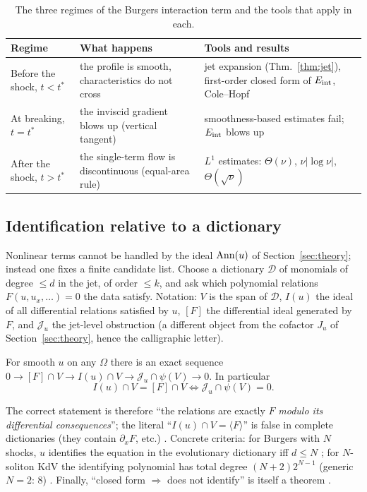 \begin{table}[!htb]
\centering\small
\begin{tabular}{@{}L{3.0cm}L{4.9cm}L{6.2cm}@{}}
\toprule
Regime & What happens & Tools and results\\\midrule
Before the shock, $t<t^*$ & the profile is smooth, characteristics do not cross & jet expansion (Thm.~\ref{thm:jet}), first-order closed form of $E_{\mathrm{int}}$, Cole--Hopf\\
At breaking, $t=t^*$ & the inviscid gradient blows up (vertical tangent) & smoothness-based estimates fail; $E_{\mathrm{int}}$ blows up\\
After the shock, $t>t^*$ & the single-term flow is discontinuous (equal-area rule) & $L^1$ estimates: $\Theta(\nu)$, $\nu|\log\nu|$, $\Theta(\sqrt\nu)$\\
\bottomrule
\end{tabular}
\caption{The three regimes of the Burgers interaction term and the tools that apply in each.}\label{tab:regimes}
\end{table}

\subsection{Identification relative to a dictionary}
Nonlinear terms cannot be handled by the ideal $\operatorname{Ann}(u)$ of Section~\ref{sec:theory}; instead one fixes a finite candidate list. Choose a dictionary $\mathcal D$ of monomials of degree $\le d$ in the jet, of order $\le k$, and ask which polynomial relations $F(u,u_x,\dots)=0$ the data satisfy. Notation: $V$ is the span of $\mathcal D$, $I(u)$ the ideal of all differential relations satisfied by $u$, $[F]$ the differential ideal generated by $F$, and $\mathcal J_u$ the jet-level obstruction (a different object from the cofactor $J_u$ of Section~\ref{sec:theory}, hence the calligraphic letter).
\begin{theorem}\label{thm:dict}
For smooth $u$ on any $\Omega$ there is an exact sequence $0\to[F]\cap V\to I(u)\cap V\to\mathcal J_u\cap\psi(V)\to0$. In particular
\[
I(u)\cap V=[F]\cap V\iff\mathcal J_u\cap\psi(V)=0 .
\]
\end{theorem}
The correct statement is therefore ``the relations are exactly $F$ \emph{modulo its differential consequences}''; the literal ``$I(u)\cap V=\langle F\rangle$'' is false in complete dictionaries (they contain $\partial_xF$, etc.) . Concrete criteria: for Burgers with $N$ shocks, $u$ identifies the equation in the evolutionary dictionary iff $d\le N$ ; for $N$-soliton KdV the identifying polynomial has total degree $(N+2)2^{N-1}$ (generic $N=2$: $8$)  . Finally, ``closed form $\Rightarrow$ does not identify'' is itself a theorem .

